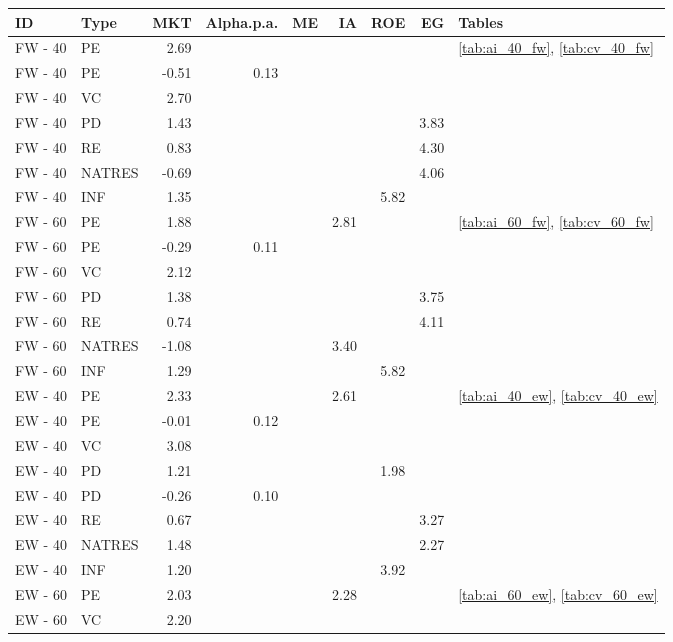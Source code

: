 \documentclass[12pt]{article}
\begin{document}
\begin{table}[ht]
	\centering
	\begin{tabular}{llrrrrrrl}
		ID & Type & MKT & Alpha.p.a. & ME & IA & ROE & EG & Tables \\ 
		\hline
		\hline
		FW - 40 & PE & 2.69 &  &  &  &  &  & \ref{tab:ai_40_fw}, \ref{tab:cv_40_fw} \\ 
		FW - 40 & PE & -0.51 & 0.13 &  &  &  &  &  \\ 
		FW - 40 & VC & 2.70 &  &  &  &  &  &  \\ 
		FW - 40 & PD & 1.43 &  &  &  &  & 3.83 &  \\ 
		FW - 40 & RE & 0.83 &  &  &  &  & 4.30 &  \\ 
		FW - 40 & NATRES & -0.69 &  &  &  &  & 4.06 &  \\ 
		FW - 40 & INF & 1.35 &  &  &  & 5.82 &  &  \\ 
		\hline
		FW - 60 & PE & 1.88 &  &  & 2.81 &  &  & \ref{tab:ai_60_fw}, \ref{tab:cv_60_fw} \\ 
		FW - 60 & PE & -0.29 & 0.11 &  &  &  &  &  \\ 
		FW - 60 & VC & 2.12 &  &  &  &  &  &  \\ 
		FW - 60 & PD & 1.38 &  &  &  &  & 3.75 &  \\ 
		FW - 60 & RE & 0.74 &  &  &  &  & 4.11 &  \\ 
		FW - 60 & NATRES & -1.08 &  &  & 3.40 &  &  &  \\ 
		FW - 60 & INF & 1.29 &  &  &  & 5.82 &  &  \\ 
		\hline
		\hline
		EW - 40 & PE & 2.33 &  &  & 2.61 &  &  & \ref{tab:ai_40_ew}, \ref{tab:cv_40_ew} \\ 
		EW - 40 & PE & -0.01 & 0.12 &  &  &  &  &  \\ 
		EW - 40 & VC & 3.08 &  &  &  &  &  &  \\ 
		EW - 40 & PD & 1.21 &  &  &  & 1.98 &  &  \\ 
		EW - 40 & PD & -0.26 & 0.10 &  &  &  &  &  \\ 
		EW - 40 & RE & 0.67 &  &  &  &  & 3.27 &  \\ 
		EW - 40 & NATRES & 1.48 &  &  &  &  & 2.27 &  \\ 
		EW - 40 & INF & 1.20 &  &  &  & 3.92 &  &  \\ 
		\hline
		EW - 60 & PE & 2.03 &  &  & 2.28 &  &  & \ref{tab:ai_60_ew}, \ref{tab:cv_60_ew} \\ 
		EW - 60 & VC & 2.20 &  &  &  &  &  &  \\ 

\end{tabular}
\end{table}
\end{document}
